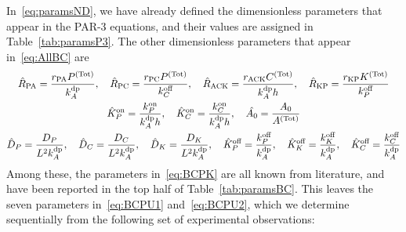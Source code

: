 \documentclass[11pt]{article}
\newcommand{\6}[1]{#1_{\text{6}}}
\newcommand{\3}[1]{#1_{\text{3}}}
\newcommand{\Tot}[1]{#1^\text{(Tot)}}
\newcommand{\A}[1]{#1_A}
\begin{document}
In\ \eqref{eq:paramsND}, we have already defined the dimensionless parameters that appear in the PAR-3 equations, and their values are assigned in Table\ \ref{tab:paramsP3}. The other dimensionless parameters that appear in\ \eqref{eq:AllBC} are 
\begin{subequations}
\label{eq:BCparams}
\begin{gather}
\label{eq:BCPU1}
\hat{R}_\text{PA}=\frac{r_\text{PA} \Tot{P}}{\kdp_A},\quad \hat{R}_\text{PC}=\frac{r_\text{PC} \Tot{P}}{\koff_C},\quad \hat{R}_\text{ACK}=\frac{r_\text{ACK}\Tot{C}}{\kdp_A h},\quad \hat{R}_\text{KP}=\frac{r_\text{KP}\Tot{K}}{\koff_P}\\ 
\label{eq:BCPU2}
\KhatonP=\frac{{\kon_P}}{\A{\kdp} h },\quad \KhatonC=\frac{{\kon_C}}{\A{\kdp} h }, \quad \hat{A_0}=\frac{A_0}{\Tot{A}}\\
\label{eq:BCPK}
\DhatP =\frac{D_P}{L^2 \A{\kdp}}, \quad \DhatC =\frac{D_C}{L^2 \A{\kdp}}, \quad  \DhatK =\frac{D_K}{L^2 \A{\kdp}},\quad \KhatoffP = \frac{\koff_P}{\kdp_A},\quad \KhatoffK = \frac{\koff_K}{\kdp_A},\quad \KhatoffC = \frac{\koff_C}{\kdp_A}
\end{gather}
\end{subequations}
Among these, the parameters in\ \eqref{eq:BCPK} are all known from literature, and have been reported in the top half of Table\ \ref{tab:paramsBC}. This leaves the seven parameters in\ \eqref{eq:BCPU1} and\ \eqref{eq:BCPU2}, which we determine sequentially from the following set of experimental observations:
\end{document}
